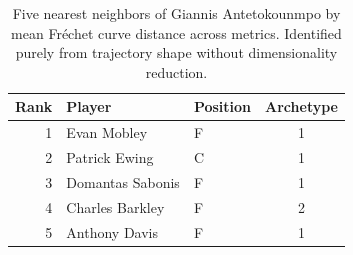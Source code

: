 \begin{table}[htbp]
  \centering\small
  \begin{tabular}{rllc}
    \toprule
    Rank & Player & Position & Archetype \\
    \midrule
    1 & Evan Mobley & F & 1 \\
    2 & Patrick Ewing & C & 1 \\
    3 & Domantas Sabonis & F & 1 \\
    4 & Charles Barkley & F & 2 \\
    5 & Anthony Davis & F & 1 \\
    \bottomrule
  \end{tabular}
  \caption{Five nearest neighbors of Giannis Antetokounmpo by mean Fr\'{e}chet curve distance across metrics. Identified purely from trajectory shape without dimensionality reduction.}
  \label{tab:Giannis_Antetokounmpo_frechet_curve_neighbors}
\end{table}

